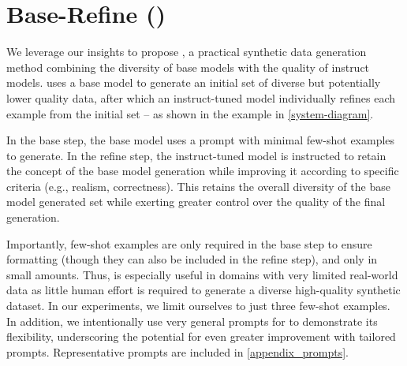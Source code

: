\section{Base-Refine (\Sys{})}
\label{bare}



We leverage our insights to propose \textbf{\Sys{}}, a practical synthetic data generation method combining the diversity of base models with the quality of instruct models. \Sys{} uses a base model to generate an initial set of diverse but potentially lower quality data, after which an instruct-tuned model individually refines each example from the initial set -- as shown in the example in \cref{system-diagram}.

In the base step, the base model uses a prompt with minimal few-shot examples to generate. In the refine step, the instruct-tuned model is instructed to retain the concept of the base model generation while improving it according to specific criteria (e.g., realism, correctness). This retains the overall diversity of the base model generated set while exerting greater control over the quality of the final generation.

Importantly, few-shot examples are only required in the base step to ensure formatting (though they can also be included in the refine step), and only in small amounts. Thus, \textbf{\Sys{}} is especially useful in domains with very limited real-world data as little human effort is required to generate a diverse high-quality synthetic dataset. In our experiments, we limit ourselves to just three few-shot examples. In addition, we intentionally use very general prompts for \Sys{} to demonstrate its flexibility, underscoring the potential for even greater improvement with tailored prompts. Representative prompts are included in \cref{appendix_prompts}.